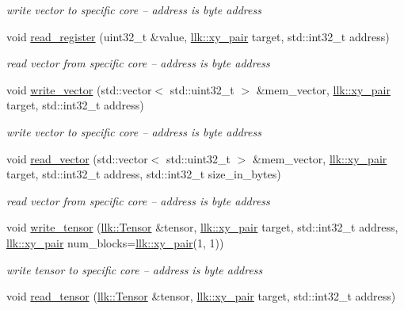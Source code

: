 \begin{DoxyCompactItemize}
\begin{DoxyCompactList}\small\item\em write vector to specific core -- address is byte address \end{DoxyCompactList}\item 
void \hyperlink{classllk_1_1Device_a6960399d0aa112fc17d743423e7fc9f9}{read\+\_\+register} (uint32\+\_\+t \&value, \hyperlink{structllk_1_1xy__pair}{llk\+::xy\+\_\+pair} target, std\+::int32\+\_\+t address)
\begin{DoxyCompactList}\small\item\em read vector from specific core -- address is byte address \end{DoxyCompactList}\item 
void \hyperlink{classllk_1_1Device_a5704d979e68f372b6490ddf52e6bbff4}{write\+\_\+vector} (std\+::vector$<$ std\+::uint32\+\_\+t $>$ \&mem\+\_\+vector, \hyperlink{structllk_1_1xy__pair}{llk\+::xy\+\_\+pair} target, std\+::int32\+\_\+t address)
\begin{DoxyCompactList}\small\item\em write vector to specific core -- address is byte address \end{DoxyCompactList}\item 
void \hyperlink{classllk_1_1Device_a1e742a4ebe3f474152878830c5e12388}{read\+\_\+vector} (std\+::vector$<$ std\+::uint32\+\_\+t $>$ \&mem\+\_\+vector, \hyperlink{structllk_1_1xy__pair}{llk\+::xy\+\_\+pair} target, std\+::int32\+\_\+t address, std\+::int32\+\_\+t size\+\_\+in\+\_\+bytes)
\begin{DoxyCompactList}\small\item\em read vector from specific core -- address is byte address \end{DoxyCompactList}\item 
void \hyperlink{classllk_1_1Device_a636a9edf251c886873b8cd2140329730}{write\+\_\+tensor} (\hyperlink{classllk_1_1Tensor}{llk\+::\+Tensor} \&tensor, \hyperlink{structllk_1_1xy__pair}{llk\+::xy\+\_\+pair} target, std\+::int32\+\_\+t address, \hyperlink{structllk_1_1xy__pair}{llk\+::xy\+\_\+pair} num\+\_\+blocks=\hyperlink{structllk_1_1xy__pair}{llk\+::xy\+\_\+pair}(1, 1))
\begin{DoxyCompactList}\small\item\em write tensor to specific core -- address is byte address \end{DoxyCompactList}\item 
void \hyperlink{classllk_1_1Device_ac399c05757459303f9d3ae64c52359da}{read\+\_\+tensor} (\hyperlink{classllk_1_1Tensor}{llk\+::\+Tensor} \&tensor, \hyperlink{structllk_1_1xy__pair}{llk\+::xy\+\_\+pair} target, std\+::int32\+\_\+t address)

\end{DoxyCompactItemize}

